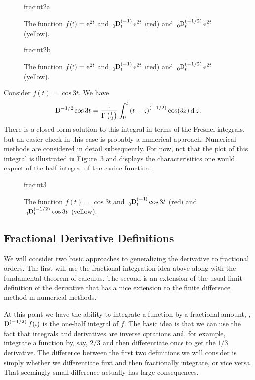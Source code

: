 \begin{figure}
  \centering
  {fracint2a}
\caption{The function $f(t) = \operatorname{e}^{2 t}$ and $\tensor*[_0]{\D}{^{(-1)}_t} \e^{2t}$ (red) and $\tensor*[_0]{\D}{^{(-1/2)}_t} \e^{2t}$ (yellow).}
  \label{fig:fracint2a}
\end{figure}

\begin{figure}
  \centering
  {fracint2b}
\caption{The function $f(t) = \operatorname{e}^{2 t}$ and $\tensor*[_0]{\D}{^{(-1)}_t} \e^{2t}$ (red) and $\tensor*[_0]{\D}{^{(-1/2)}_t} \e^{2t}$ (yellow).}
  \label{fig:fracint2b}
\end{figure}

\begin{example}
  Consider $f(t) = \cos 3 t$. We have
  \begin{equation*}
    \tensor*[]{\D}{^{-1/2}} \cos 3 t = \frac{1}{\Gamma \left( \frac{1}{2} \right) } \int_0^t \left( t - z \right)^{\left( -1/2 \right)} \cos(3z) \d{z}.
  \end{equation*}
  There is a closed-form solution to this integral in terms of the Fresnel integrals, but an easier check in this case is probably a numerical approach. Numerical methods are considered in detail subsequently. For now, not that the plot of this integral is illustrated in Figure~\ref{fig:fracint3} and displays the characterisitics one would expect of the half integral of the cosine function. 
\end{example}

\begin{figure}
  \centering
  {fracint3}
\caption{The function $f(t) = \cos 3 t$ and $\tensor*[_0]{\D}{^{(-1)}_t} \cos 3 t$ (red) and $\tensor*[_0]{\D}{^{(-1/2)}_t} \cos 3t$ (yellow).}
  \label{fig:fracint3}
\end{figure}

\subsection{Fractional Derivative Definitions}

We will consider two basic approaches to generalizing the derivative to fractional orders. The first will use the fractional integration idea above along with the fundamental theorem of calculus. The second is an extension of the usual limit definition of the derivative that has a nice extension to the finite difference method in numerical methods.

At this point we have the ability to integrate a function by a fractional amount, \eg, $\tensor*{\D}{^{\left( -1/2 \right)}}f(t)$ is the one-half integral of $f$. The basic idea is that we can use the fact that integrals and derivatives are inverse oprations and, for example, integrate a function by, say, $2/3$ and then differentiate once to get the $1/3$ derivative. The difference between the first two definitions we will consider is simply whether we differentiate first and then fractionally integrate, or vice versa. That seemingly small difference actually has large consequences.

